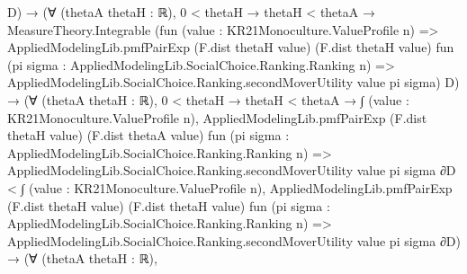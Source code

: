 \documentclass[10pt]{article}
\begin{document}
\begin{ReviewVerbatim}
                                              D) →
                                      (∀ (thetaA thetaH : ℝ),
                                          0 < thetaH →
                                            thetaH < thetaA →
                                              MeasureTheory.Integrable
                                                (fun (value : KR21Monoculture.ValueProfile n) =>
                                                  AppliedModelingLib.pmfPairExp (F.dist thetaH value)
                                                    (F.dist thetaH value)
                                                    fun
                                                      (pi sigma : AppliedModelingLib.SocialChoice.Ranking.Ranking n) =>
                                                    AppliedModelingLib.SocialChoice.Ranking.secondMoverUtility value pi
                                                      sigma)
                                                D) →
                                        (∀ (thetaA thetaH : ℝ),
                                            0 < thetaH →
                                              thetaH < thetaA →
                                                ∫ (value : KR21Monoculture.ValueProfile n),
                                                    AppliedModelingLib.pmfPairExp (F.dist thetaH value)
                                                      (F.dist thetaA value)
                                                      fun
                                                        (pi sigma :
                                                          AppliedModelingLib.SocialChoice.Ranking.Ranking n) =>
                                                      AppliedModelingLib.SocialChoice.Ranking.secondMoverUtility value
                                                        pi sigma ∂D <
                                                  ∫ (value : KR21Monoculture.ValueProfile n),
                                                    AppliedModelingLib.pmfPairExp (F.dist thetaH value)
                                                      (F.dist thetaH value)
                                                      fun
                                                        (pi sigma :
                                                          AppliedModelingLib.SocialChoice.Ranking.Ranking n) =>
                                                      AppliedModelingLib.SocialChoice.Ranking.secondMoverUtility value
                                                        pi sigma ∂D) →
                                          (∀ (thetaA thetaH : ℝ),

\end{ReviewVerbatim}
\end{document}
